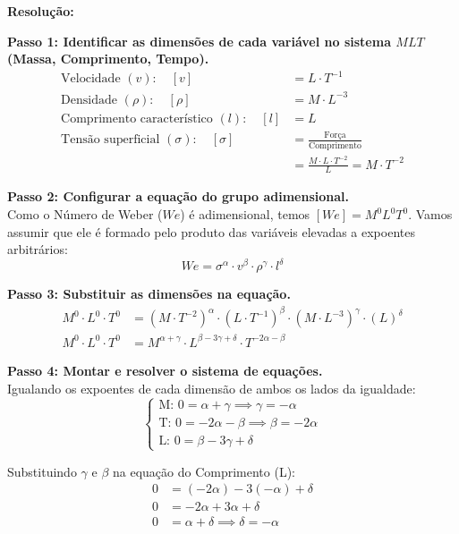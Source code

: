 \noindent\textbf{Resolução:}

\textbf{Passo 1: Identificar as dimensões de cada variável no sistema $MLT$ (Massa, Comprimento, Tempo).}
\begin{align*}
\text{Velocidade } (v): \quad [v] &= L \cdot T^{-1} \\
\text{Densidade } (\rho): \quad [\rho] &= M \cdot L^{-3} \\
\text{Comprimento característico } (l): \quad [l] &= L \\
\text{Tensão superficial } (\sigma): \quad [\sigma] &= \frac{\text{Força}}{\text{Comprimento}} \\
&= \frac{M \cdot L \cdot T^{-2}}{L} = M \cdot T^{-2}
\end{align*}

\textbf{Passo 2: Configurar a equação do grupo adimensional.} \\
Como o Número de Weber ($We$) é adimensional, temos $[We] = M^0 L^0 T^0$.
Vamos assumir que ele é formado pelo produto das variáveis elevadas a expoentes arbitrários:
\[ We = \sigma^\alpha \cdot v^\beta \cdot \rho^\gamma \cdot l^\delta \]

\textbf{Passo 3: Substituir as dimensões na equação.}
\begin{align*}
M^0 \cdot L^0 \cdot T^0 &= (M \cdot T^{-2})^\alpha \cdot (L \cdot T^{-1})^\beta \cdot (M \cdot L^{-3})^\gamma \cdot (L)^\delta \\
M^0 \cdot L^0 \cdot T^0 &= M^{\alpha+\gamma} \cdot L^{\beta-3\gamma+\delta} \cdot T^{-2\alpha-\beta}
\end{align*}

\textbf{Passo 4: Montar e resolver o sistema de equações.} \\
Igualando os expoentes de cada dimensão de ambos os lados da igualdade:
\[
\begin{cases}
\text{M: } 0 = \alpha + \gamma \implies \gamma = -\alpha \\
\text{T: } 0 = -2\alpha - \beta \implies \beta = -2\alpha \\
\text{L: } 0 = \beta - 3\gamma + \delta
\end{cases}
\]

Substituindo $\gamma$ e $\beta$ na equação do Comprimento (L):
\begin{align*}
0 &= (-2\alpha) - 3(-\alpha) + \delta \\
0 &= -2\alpha + 3\alpha + \delta \\
0 &= \alpha + \delta \implies \delta = -\alpha
\end{align*}

